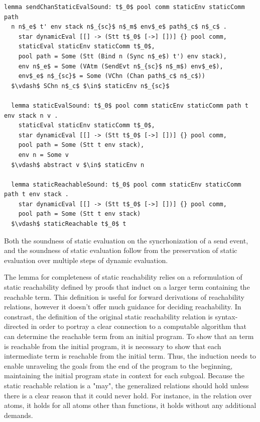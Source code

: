 \documentclass[letterpaper, 11pt]{extarticle}
\begin{document}
\begin{lstlisting}[language=logic, mathescape]
  lemma sendChanStaticEvalSound: t$_0$ pool comm staticEnv staticComm path
  n n$_e$ t' env stack n$_{sc}$ n$_m$ env$_e$ path$_c$ n$_c$ .
    star dynamicEval [[] -> (Stt t$_0$ [->] [])] {} pool comm,
    staticEval staticEnv staticComm t$_0$,
    pool path = Some (Stt (Bind n (Sync n$_e$) t') env stack),
    env n$_e$ = Some (VAtm (SendEvt n$_{sc}$ n$_m$) env$_e$),
    env$_e$ n$_{sc}$ = Some (VChn (Chan path$_c$ n$_c$))
  $\vdash$ SChn n$_c$ $\in$ staticEnv n$_{sc}$

  lemma staticEvalSound: t$_0$ pool comm staticEnv staticComm path t env stack n v .
    staticEval staticEnv staticComm t$_0$, 
    star dynamicEval [[] -> (Stt t$_0$ [->] [])] {} pool comm,
    pool path = Some (Stt t env stack), 
    env n = Some v
  $\vdash$ abstract v $\in$ staticEnv n 

  lemma staticReachableSound: t$_0$ pool comm staticEnv staticComm path t env stack .
    star dynamicEval [[] -> (Stt t$_0$ [->] [])] {} pool comm,
    pool path = Some (Stt t env stack)
  $\vdash$ staticReachable t$_0$ t 
\end{lstlisting}

Both the soundness of static evaluation on the syncrhonization of a send event,
and the soundness of static evaluation follow from
the preservation of static evaluation over multiple steps of dynamic evaluation.

The lemma for completeness of static reachability relies on a reformulation of
static reachability defined by proofs that induct on a larger term
containing the reachable term.  This definition is useful for forward derivations
of reachability relations, however it doesn't offer much guidance for deciding reachability. 
In constrast, the definition of the original static reachability relation is
syntax-directed in order to portray a clear connection to
a computable algorithm that can determine the reachable term from an initial program.
To show that an term is reachable from the initial program, it is necessary to
show that each intermediate term is reachable from the initial term.  Thus, the
induction needs to enable unraveling the goals from the end of the program to the beginning,
maintaining the initial program state in context for each subgoal. Because the static
reachable relation is a "may", the generalized relations should hold unless there is
a clear reason that it could never hold. For instance, in the relation over atoms, it holds
for all atoms other than functions, it holds without any additional demands. 
\end{document}
